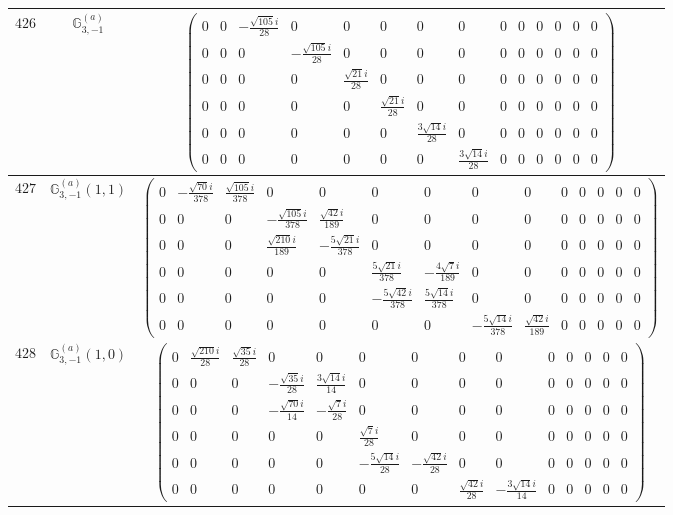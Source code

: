 \documentclass[fleqn,8pt,landscape]{jsarticle}
\begin{document}
\begin{center}
\begin{longtable}{ccc}
$ 426 $ & $ \mathbb{G}_{3,-1}^{(a)} $ & $ \begin{pmatrix} 0 & 0 & - \frac{\sqrt{105} i}{28} & 0 & 0 & 0 & 0 & 0 & 0 & 0 & 0 & 0 & 0 & 0 \\ 0 & 0 & 0 & - \frac{\sqrt{105} i}{28} & 0 & 0 & 0 & 0 & 0 & 0 & 0 & 0 & 0 & 0 \\ 0 & 0 & 0 & 0 & \frac{\sqrt{21} i}{28} & 0 & 0 & 0 & 0 & 0 & 0 & 0 & 0 & 0 \\ 0 & 0 & 0 & 0 & 0 & \frac{\sqrt{21} i}{28} & 0 & 0 & 0 & 0 & 0 & 0 & 0 & 0 \\ 0 & 0 & 0 & 0 & 0 & 0 & \frac{3 \sqrt{14} i}{28} & 0 & 0 & 0 & 0 & 0 & 0 & 0 \\ 0 & 0 & 0 & 0 & 0 & 0 & 0 & \frac{3 \sqrt{14} i}{28} & 0 & 0 & 0 & 0 & 0 & 0 \end{pmatrix} $ \\ \hline
$ 427 $ & $ \mathbb{G}_{3,-1}^{(a)}(1,1) $ & $ \begin{pmatrix} 0 & - \frac{\sqrt{70} i}{378} & \frac{\sqrt{105} i}{378} & 0 & 0 & 0 & 0 & 0 & 0 & 0 & 0 & 0 & 0 & 0 \\ 0 & 0 & 0 & - \frac{\sqrt{105} i}{378} & \frac{\sqrt{42} i}{189} & 0 & 0 & 0 & 0 & 0 & 0 & 0 & 0 & 0 \\ 0 & 0 & 0 & \frac{\sqrt{210} i}{189} & - \frac{5 \sqrt{21} i}{378} & 0 & 0 & 0 & 0 & 0 & 0 & 0 & 0 & 0 \\ 0 & 0 & 0 & 0 & 0 & \frac{5 \sqrt{21} i}{378} & - \frac{4 \sqrt{7} i}{189} & 0 & 0 & 0 & 0 & 0 & 0 & 0 \\ 0 & 0 & 0 & 0 & 0 & - \frac{5 \sqrt{42} i}{378} & \frac{5 \sqrt{14} i}{378} & 0 & 0 & 0 & 0 & 0 & 0 & 0 \\ 0 & 0 & 0 & 0 & 0 & 0 & 0 & - \frac{5 \sqrt{14} i}{378} & \frac{\sqrt{42} i}{189} & 0 & 0 & 0 & 0 & 0 \end{pmatrix} $ \\ \hline
$ 428 $ & $ \mathbb{G}_{3,-1}^{(a)}(1,0) $ & $ \begin{pmatrix} 0 & \frac{\sqrt{210} i}{28} & \frac{\sqrt{35} i}{28} & 0 & 0 & 0 & 0 & 0 & 0 & 0 & 0 & 0 & 0 & 0 \\ 0 & 0 & 0 & - \frac{\sqrt{35} i}{28} & \frac{3 \sqrt{14} i}{14} & 0 & 0 & 0 & 0 & 0 & 0 & 0 & 0 & 0 \\ 0 & 0 & 0 & - \frac{\sqrt{70} i}{14} & - \frac{\sqrt{7} i}{28} & 0 & 0 & 0 & 0 & 0 & 0 & 0 & 0 & 0 \\ 0 & 0 & 0 & 0 & 0 & \frac{\sqrt{7} i}{28} & 0 & 0 & 0 & 0 & 0 & 0 & 0 & 0 \\ 0 & 0 & 0 & 0 & 0 & - \frac{5 \sqrt{14} i}{28} & - \frac{\sqrt{42} i}{28} & 0 & 0 & 0 & 0 & 0 & 0 & 0 \\ 0 & 0 & 0 & 0 & 0 & 0 & 0 & \frac{\sqrt{42} i}{28} & - \frac{3 \sqrt{14} i}{14} & 0 & 0 & 0 & 0 & 0 \end{pmatrix} $ \\ \hline

\end{longtable}
\end{center}
\end{document}
